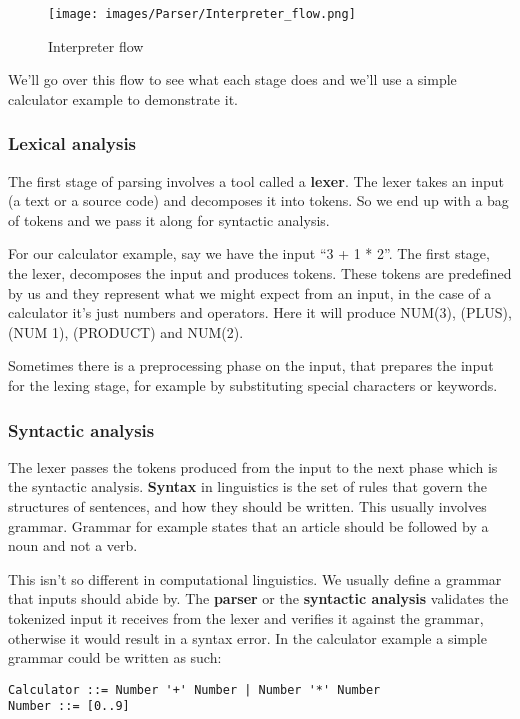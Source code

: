 \documentclass[12pt]{article}
\begin{document}
\begin{figure}[ht!]
 	\centering
 	\caption{Interpreter flow}
 	\texttt{[image: images/Parser/Interpreter\_flow.png]}
 	\label{lab:perceptron}
\end{figure}

We’ll go over this flow to see what each stage does and we’ll use a simple calculator example to demonstrate it.

\subsubsection{Lexical analysis}
The first stage of parsing involves a tool called a \textbf{lexer}. The lexer takes an input (a text or a source code) and decomposes it into tokens. So we end up with a bag of tokens and we pass it along for syntactic analysis.

For our calculator example, say we have the input “3 + 1 * 2”. The first stage, the lexer,  decomposes the input and produces tokens. These tokens are predefined by us and they represent what we might expect from an input, in the case of a calculator it’s just numbers and operators. Here it will produce NUM(3), (PLUS), (NUM 1), (PRODUCT) and NUM(2). 

Sometimes there is a preprocessing phase on the input, that prepares the input for the lexing stage, for example by substituting special characters or keywords. 

\subsubsection{Syntactic analysis}
The lexer passes the tokens produced from the input to the next phase which is the syntactic analysis. \textbf{Syntax} in linguistics is the set of rules that govern the structures of sentences, and how they should be written. This usually involves grammar. Grammar for example states that an article should be followed by a noun and not a verb.

This isn’t so different in computational linguistics. We usually define a grammar that inputs should abide by. The \textbf{parser} or the \textbf{syntactic analysis} validates the tokenized input it receives from the lexer and verifies it against the grammar, otherwise it would result in a syntax error. In the calculator example a simple grammar could be written as such:

\begin{lstlisting}
Calculator ::= Number '+' Number | Number '*' Number
Number ::= [0..9]
\end{lstlisting}
\end{document}
